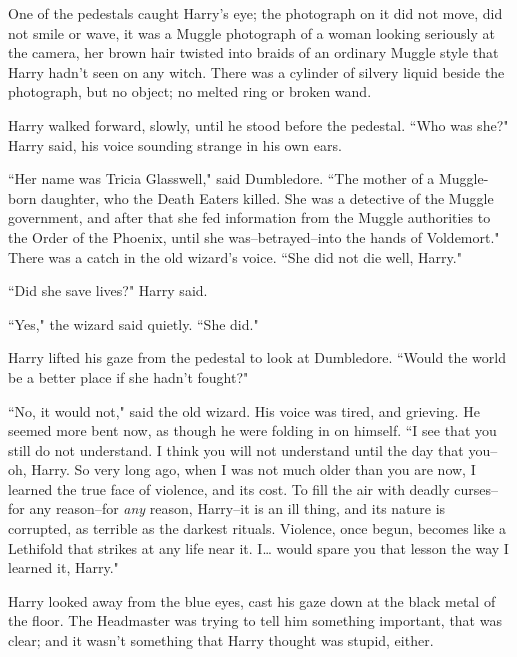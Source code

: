 One of the pedestals caught Harry's eye; the photograph on it did not move, did not smile or wave, it was a Muggle photograph of a woman looking seriously at the camera, her brown hair twisted into braids of an ordinary Muggle style that Harry hadn't seen on any witch. There was a cylinder of silvery liquid beside the photograph, but no object; no melted ring or broken wand.

Harry walked forward, slowly, until he stood before the pedestal. ``Who was she?" Harry said, his voice sounding strange in his own ears.

``Her name was Tricia Glasswell," said Dumbledore. ``The mother of a Muggle-born daughter, who the Death Eaters killed. She was a detective of the Muggle government, and after that she fed information from the Muggle authorities to the Order of the Phoenix, until she was\---betrayed\---into the hands of Voldemort." There was a catch in the old wizard's voice. ``She did not die well, Harry."

``Did she save lives?" Harry said.

``Yes," the wizard said quietly. ``She did."

Harry lifted his gaze from the pedestal to look at Dumbledore. ``Would the world be a better place if she hadn't fought?"

``No, it would not," said the old wizard. His voice was tired, and grieving. He seemed more bent now, as though he were folding in on himself. ``I see that you still do not understand. I think you will not understand until the day that you\---oh, Harry. So very long ago, when I was not much older than you are now, I learned the true face of violence, and its cost. To fill the air with deadly curses\---for any reason\---for \emph{any} reason, Harry\---it is an ill thing, and its nature is corrupted, as terrible as the darkest rituals. Violence, once begun, becomes like a Lethifold that strikes at any life near it. I{\ldots} would spare you that lesson the way I learned it, Harry."

Harry looked away from the blue eyes, cast his gaze down at the black metal of the floor. The Headmaster was trying to tell him something important, that was clear; and it wasn't something that Harry thought was stupid, either.

